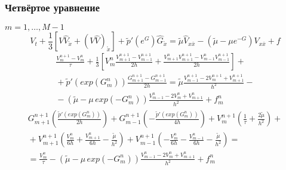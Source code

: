 \subsubsection*{Четвёртое уравнение}
$m = 1,\dots, M-1$
\begin{equation*}
  V_t + \frac13 [V \hat V_{\mathring{x}} + (V \hat V)_{\mathring{x}} ] + 
    \tilde{p}'(e^G) \hat G_{\mathring{x}} =
    \tilde{\mu} \hat V_{x \bar x} - 
    (\tilde{\mu} - \mu e^{-G}) V_{x \bar x} + f
\end{equation*}
\begin{multline*}
  \frac{V_{m}^{n+1} - V_{m}^{n}}{\tau} + \frac13 \left[
    V_{m}^{n} \frac{V_{m+1}^{n+1} - V_{m-1}^{n+1}}{2h} +
    \frac{V_{m+1}^{n} V_{m+1}^{n+1} - V_{m-1}^{n} V_{m-1}^{n+1}}{2h} 
    \right] +{} \\ {}+
  \tilde{p}'(exp(G_{m}^{n})) \frac{G_{m+1}^{n+1} - G_{m-1}^{n+1}}{2h} =
  \tilde{\mu} \frac{V_{m-1}^{n+1} - 2 V_{m}^{n+1} + V_{m+1}^{n+1}}{h^2}
  -{} \\ {}-
  (\tilde{\mu} - \mu\,exp(-G_{m}^{n}))
    \frac{V_{m-1}^{n} - 2 V_{m}^{n} + V_{m+1}^{n}}{h^2} + f_{m}^{n}
\end{multline*}
\begin{multline*}
  G_{m+1}^{n+1} \left( \frac{\tilde{p}'(exp(G_{m}^{n}))}{2h} \right) +
  G_{m-1}^{n+1} \left(-\frac{\tilde{p}'(exp(G_{m}^{n}))}{4h} \right) +
  V_{m}^{n+1} \left( \frac{1}{\tau} + \frac{2\tilde{\mu}}{h^2} \right)
  +{} \\ {}+
  V_{m+1}^{n+1} \left( 
    \frac{V_{m}^{n}}{6h} + \frac{V_{m+1}^{n}}{6h} - \frac{\tilde{\mu}}{h^2} \right) +
  V_{m-1}^{n+1} \left( 
    -\frac{V_{m}^{n}}{6h} - \frac{V_{m-1}^{n}}{6h} - \frac{\tilde{\mu}}{h^2} \right)
  = \\ =
  \frac{V_{m}^{n}}{\tau} -
  (\tilde{\mu} - \mu\,exp(-G_{m}^{n}))
    \frac{V_{m-1}^{n} - 2 V_{m}^{n} + V_{m+1}^{n}}{h^2} + f_{m}^{n}
\end{multline*}

